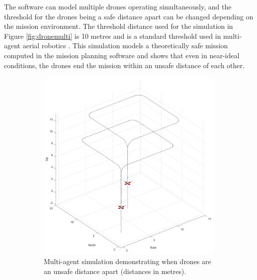 The software can model multiple drones operating simultaneously, and the threshold for the drones being a safe distance apart can be changed depending on the mission environment. The threshold distance used for the simulation in Figure \ref{fig:dronemulti} is 10 metres and is a standard threshold used in multi-agent aerial robotics \cite{crannverdon}. This simulation models a theoretically safe mission computed in the mission planning software and shows that even in near-ideal conditions, the drones end the mission within an unsafe distance of each other. 
 
\begin{figure}[H]
    \centering
    \begin{subfigure}[b]{0.48\textwidth} %
        \centering
        \includegraphics[width=\textwidth]{figs/Samuel/Figures/MultiAgentExampleRed (2).pdf}
        \caption{Multi-agent simulation demonstrating when drones are an unsafe distance apart (distances in metres).}
        \label{fig:1a}
    \end{subfigure}
    \hspace{0.01\textwidth}
    \begin{subfigure}[b]{0.48\textwidth} %
        \centering

\end{subfigure}
\end{figure}
